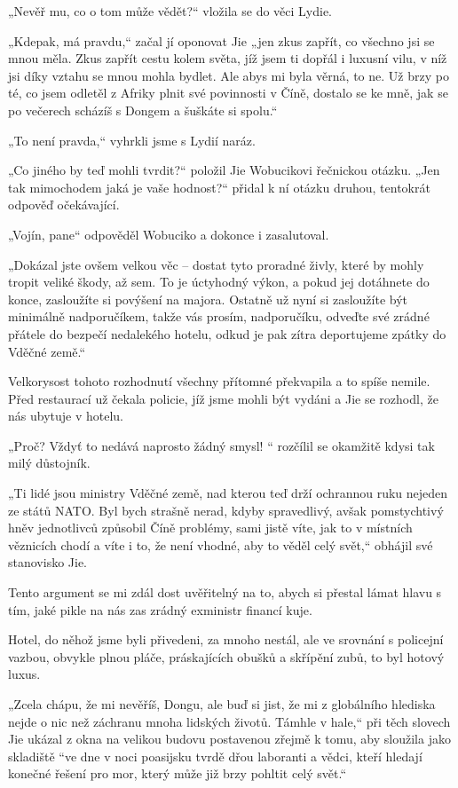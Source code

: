 „Nevěř mu, co o tom může vědět?“ vložila se do věci Lydie.

„Kdepak, má pravdu,“ začal jí oponovat Jie „jen zkus zapřít, co všechno jsi se mnou měla. Zkus zapřít cestu kolem světa, jíž jsem ti dopřál i luxusní vilu, v níž jsi díky vztahu se mnou mohla bydlet. Ale abys mi byla věrná, to ne. Už brzy po té, co jsem odletěl z Afriky plnit své povinnosti v Číně, dostalo se ke mně, jak se po večerech scházíš s Dongem a šuškáte si spolu.“

„To není pravda,“ vyhrkli jsme s Lydií naráz.

„Co jiného by teď mohli tvrdit?“ položil Jie Wobucikovi řečnickou otázku. „Jen tak mimochodem jaká je vaše hodnost?“ přidal k ní otázku druhou, tentokrát odpověď očekávající.

„Vojín, pane“ odpověděl Wobuciko a dokonce i zasalutoval.

„Dokázal jste ovšem velkou věc – dostat tyto proradné živly, které by mohly tropit veliké škody, až sem. To je úctyhodný výkon, a pokud jej dotáhnete do konce, zasloužíte si povýšení na majora. Ostatně už nyní si zasloužíte být minimálně nadporučíkem, takže vás prosím, nadporučíku, odveďte své zrádné přátele do bezpečí nedalekého hotelu, odkud je pak zítra deportujeme zpátky do Vděčné země.“

Velkorysost tohoto rozhodnutí všechny přítomné překvapila a to spíše nemile. Před restaurací už čekala policie, jíž jsme mohli být vydáni a Jie se rozhodl, že nás ubytuje v hotelu.

„Proč? Vždyť to nedává naprosto žádný smysl! “ rozčílil se okamžitě kdysi tak milý důstojník.

„Ti lidé jsou ministry Vděčné země, nad kterou teď drží ochrannou ruku nejeden ze států NATO. Byl bych strašně nerad, kdyby spravedlivý, avšak pomstychtivý hněv jednotlivců způsobil Číně problémy, sami jistě víte, jak to v místních věznicích chodí a víte i to, že není vhodné, aby to věděl celý svět,“ obhájil své stanovisko Jie.

Tento argument se mi zdál dost uvěřitelný na to, abych si přestal lámat hlavu s tím, jaké pikle na nás zas zrádný exministr financí kuje.

Hotel, do něhož jsme byli přivedeni, za mnoho nestál, ale ve srovnání s policejní vazbou, obvykle plnou pláče, práskajících obušků a skřípění zubů, to byl hotový luxus. 

„Zcela chápu, že mi nevěříš, Dongu, ale buď si jist, že mi z globálního hlediska nejde o nic než záchranu mnoha lidských životů. Támhle v hale,“ při těch slovech Jie ukázal z okna na velikou budovu postavenou zřejmě k tomu, aby sloužila jako skladiště “ve dne v noci poasijsku tvrdě dřou laboranti a vědci, kteří hledají konečné řešení pro mor, který může již brzy pohltit celý svět.“


